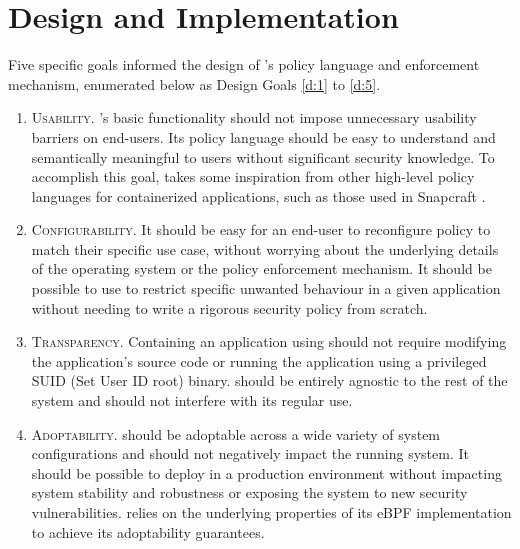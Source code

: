 \section{\bpfcontain{} Design and Implementation}
\label{sec:design}

Five specific goals informed the design of \bpfcontain{}'s policy language and
enforcement mechanism, enumerated below as Design Goals \ref{d:1} to \ref{d:5}.

\begin{enumerate}[label=\bfseries D\arabic*., ref=D\arabic*, labelindent=1em]
  \item \label{d:1} \textsc{Usability.}
    \bpfcontain{}'s basic functionality should not impose unnecessary usability
    barriers on end-users.  Its policy language should be easy to understand and
    semantically meaningful to users without significant security knowledge. To
    accomplish this goal, \bpfcontain{} takes some inspiration from other high-level
    policy languages for containerized applications, such as those used in
    Snapcraft \cite{snap}.

  \item \label{d:2} \textsc{Configurability.}
    It should be easy for an end-user to reconfigure policy to match their
    specific use case, without worrying about the underlying details of the
    operating system or the policy enforcement mechanism. It should be possible
    to use \bpfcontain{} to restrict specific unwanted behaviour in a given
    application without needing to write a rigorous security policy from
    scratch.

  \item \label{d:3} \textsc{Transparency.}
    Containing an application using \bpfcontain{} should not require modifying the
    application's source code or running the application using a privileged SUID
    (Set User ID root) binary. \bpfcontain{} should be entirely agnostic to the rest
    of the system and should not interfere with its regular use.

  \item \label{d:4} \textsc{Adoptability.}
    \bpfcontain{} should be adoptable across a wide variety of system configurations
    and should not negatively impact the running system. It should be possible
    to deploy \bpfcontain{} in a production environment without impacting system
    stability and robustness or exposing the system to new security
    vulnerabilities. \bpfcontain{} relies on the underlying properties of its eBPF
    implementation to achieve its adoptability guarantees.


\end{enumerate}
